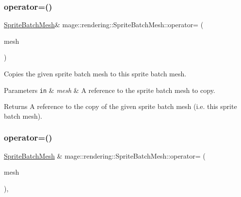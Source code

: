 \subsubsection{\texorpdfstring{operator=()}{operator=()}\hspace{0.1cm}{\footnotesize\ttfamily [1/2]}}
{\footnotesize\ttfamily \hyperlink{classmage_1_1rendering_1_1_sprite_batch_mesh}{Sprite\+Batch\+Mesh}\& mage\+::rendering\+::\+Sprite\+Batch\+Mesh\+::operator= (\begin{DoxyParamCaption}\item[{const \hyperlink{classmage_1_1rendering_1_1_sprite_batch_mesh}{Sprite\+Batch\+Mesh} \&}]{mesh }\end{DoxyParamCaption})\hspace{0.3cm}{\ttfamily [delete]}}

Copies the given sprite batch mesh to this sprite batch mesh.


\begin{DoxyParams}[1]{Parameters}
\mbox{\tt in}  & {\em mesh} & A reference to the sprite batch mesh to copy. \\
\hline
\end{DoxyParams}
\begin{DoxyReturn}{Returns}
A reference to the copy of the given sprite batch mesh (i.\+e. this sprite batch mesh). 
\end{DoxyReturn}
\hypertarget{classmage_1_1rendering_1_1_sprite_batch_mesh_a9ab382cdbdb112391eb857e139f6399a}{}\label{classmage_1_1rendering_1_1_sprite_batch_mesh_a9ab382cdbdb112391eb857e139f6399a} 
\subsubsection{\texorpdfstring{operator=()}{operator=()}\hspace{0.1cm}{\footnotesize\ttfamily [2/2]}}
{\footnotesize\ttfamily \hyperlink{classmage_1_1rendering_1_1_sprite_batch_mesh}{Sprite\+Batch\+Mesh} \& mage\+::rendering\+::\+Sprite\+Batch\+Mesh\+::operator= (\begin{DoxyParamCaption}\item[{\hyperlink{classmage_1_1rendering_1_1_sprite_batch_mesh}{Sprite\+Batch\+Mesh} \&\&}]{mesh }\end{DoxyParamCaption})\hspace{0.3cm}{\ttfamily [default]}, {\ttfamily [noexcept]}}

